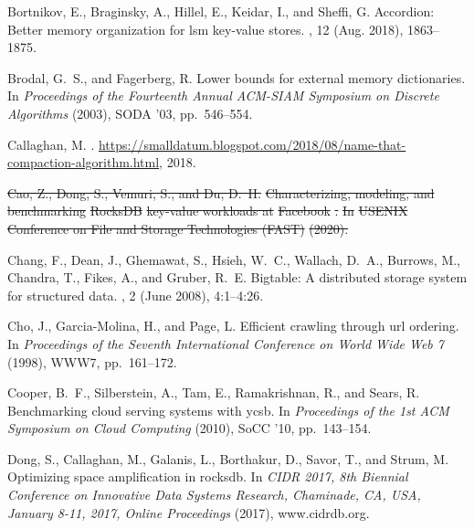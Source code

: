 \documentclass[sigplan,10pt]{acmart}
\providecommand{\DIFdel}[1]{{\protect\color{red}\sout{#1}}}                      %
\providecommand{\DIFdelbegin}{} %
\providecommand{\DIFdelend}{} %
\begin{document}
\begin{thebibliography}{10}
{\sc Bortnikov, E., Braginsky, A., Hillel, E., Keidar, I., and Sheffi, G.}
\newblock Accordion: Better memory organization for lsm key-value stores.
, 12 (Aug. 2018), 1863--1875.

{\sc Brodal, G.~S., and Fagerberg, R.}
\newblock Lower bounds for external memory dictionaries.
\newblock In {\em Proceedings of the Fourteenth Annual ACM-SIAM Symposium on
  Discrete Algorithms\/} (2003), SODA '03, pp.~546--554.

{\sc Callaghan, M.}
.
\newblock
  \url{https://smalldatum.blogspot.com/2018/08/name-that-compaction-algorithm.html},
  2018.

\DIFdelbegin %
\DIFdel{Cao, Z., Dong, S., Vemuri, S., and Du, D.~H.}%
\DIFdel{Characterizing, modeling, and benchmarking }%
\DIFdel{RocksDB}%
\DIFdel{key-value
  workloads at }%
\DIFdel{Facebook}%
\DIFdel{.
}%
\DIFdel{In }%
\DIFdel{USENIX Conference on File and Storage Technologies (FAST)\/}%
\DIFdel{(2020).
}%

\DIFdelend {}
{\sc Chang, F., Dean, J., Ghemawat, S., Hsieh, W.~C., Wallach, D.~A., Burrows,
  M., Chandra, T., Fikes, A., and Gruber, R.~E.}
\newblock Bigtable: A distributed storage system for structured data.
, 2 (June 2008), 4:1--4:26.

{\sc Cho, J., Garcia-Molina, H., and Page, L.}
\newblock Efficient crawling through url ordering.
\newblock In {\em Proceedings of the Seventh International Conference on World
  Wide Web 7\/} (1998), WWW7, pp.~161--172.

{\sc Cooper, B.~F., Silberstein, A., Tam, E., Ramakrishnan, R., and Sears, R.}
\newblock Benchmarking cloud serving systems with ycsb.
\newblock In {\em Proceedings of the 1st ACM Symposium on Cloud Computing\/}
  (2010), SoCC '10, pp.~143--154.

{\sc Dong, S., Callaghan, M., Galanis, L., Borthakur, D., Savor, T., and Strum,
  M.}
\newblock Optimizing space amplification in rocksdb.
\newblock In {\em {CIDR} 2017, 8th Biennial Conference on Innovative Data
  Systems Research, Chaminade, CA, USA, January 8-11, 2017, Online
  Proceedings\/} (2017), www.cidrdb.org.


\end{thebibliography}
\end{document}
